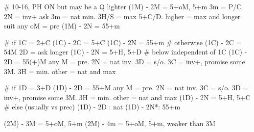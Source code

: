 # 10-16, PH ON but may be a Q lighter
(1M) - 2M = 5+oM, 5+m
    3m = P/C
    2N = inv+ ask
        3m = nat min. 3H/S = max 5+C/D. higher = max and longer suit
    any oM = pre
(1M) - 2N = 55+m

# if 1C = 2+C
(1C) - 2C = 5+C
(1C) - 2N = 55+m
# otherwise
(1C) - 2C = 54M  
    2D = ask longer
(1C) - 2N = 5+H, 5+D
# below independent of 1C
(1C) - 2D = 55(+)M 
    any M = pre. 2N = nat inv. 3D = s/o. 
    3C = inv+, promise some 3M. 
        3H = min. other = nat and max

# if 1D = 3+D
(1D) - 2D = 55+M
    any M = pre. 2N = nat inv. 3C = s/o. 
    3D = inv+, promise some 3M. 
        3H = min. other = nat and max
(1D) - 2N = 5+H, 5+C
# else (usually vs prec)
(1D) - 2D : nat 
(1D) - 2N*: 55+m

(2M) - 3M = 5+oM, 5+m
(2M) - 4m = 5+oM, 5+m, weaker than 3M
